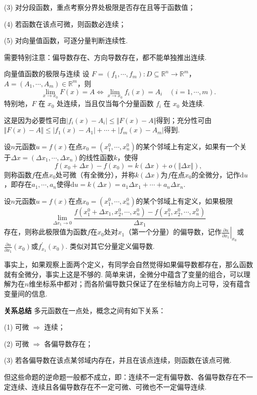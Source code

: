 \documentclass{ctexart}
\newenvironment{custom}[1]{\par\noindent \textbf{#1}\quad}{\par\vspace{1em}}
\begin{document}
(3) 对分段函数，重点考察分界处极限是否存在且等于函数值；

(4) 若函数在该点可微，则函数必连续；

(5) 对向量值函数，可逐分量判断连续性.

需要特别注意：偏导数存在、方向导数存在，都不能单独推出连续.

\begin{definition}{向量值函数的极限与连续}
设 $F=(f_1,\cdots,f_m):D\subseteq\mathbb{R}^n\to\mathbb{R}^m$，
$A=(A_1,\cdots,A_m)\in\mathbb{R}^m$，则
$$\lim\limits_{x\to x_0}F(x)=A
\Longleftrightarrow
\lim\limits_{x\to x_0}f_i(x)=A_i\quad(i=1,\cdots,m).$$
特别地，$F$ 在 $x_0$ 处连续，当且仅当每个分量函数 $f_i$ 在 $x_0$ 处连续.

这是因为必要性可由$|f_i(x)-A_i|\leqslant \Vert F(x)-A\Vert$得到；充分性可由$\Vert F(x)-A\Vert\leqslant |f_1(x)-A_1|+\cdots+|f_m(x)-A_m|$得到.
\end{definition}

\begin{definition}
设$n$元函数$u=f(x)$在点$x_{0}=(x_{1}^{0},\cdots,x_{n}^{0})$的某个邻域上有定义，如果有一个关于$\Delta x=(\Delta x_{1},\cdots,\Delta x_{n})$的线性函数$k$，使得
$$f(x_{0}+\Delta x)-f(x_{0})=k(\Delta x)+o(\Vert \Delta x\Vert),$$
则称函数$f$在点$x_{0}$处可微（有全微分），并称$k(\Delta x)$为$f$在点$x_{0}$的全微分，记作$\mathrm{d}u$，即存在$a_{1},\cdots,a_{n}$使得$\mathrm{d}u=k(\Delta x)=a_{1}\Delta x_{1}+\cdots+a_{n}\Delta x_{n}$.
\end{definition}

\begin{definition}
设$n$元函数$u=f(x)$在点$x_{0}=(x_{1}^{0},\cdots,x_{n}^{0})$的某个邻域上有定义，如果极限
$$\lim\limits_{\Delta x_{1}\to 0}{\frac{f(x_{1}^{0}+\Delta x_{1},x_{2}^{0},\cdots,x_{n}^{0})-f(x_{1}^{0},x_{2}^{0},\cdots,x_{n}^{0})}{\Delta x_{1}}}$$
存在，则称此极限值为函数$f$在$x_{0}$处对$x_{1}$（第一个分量）的偏导数，记作$\left.\frac{\partial u}{\partial x_{1}}\right|_{x_{0}}$或$\frac{\partial u}{\partial x_{1}}(x_{0})$或$f^{\prime}_{x_{1}}(x_{0})$. 类似对其它分量定义偏导数.
\end{definition}

事实上，如果观察上面两个定义，有同学会自然觉得如果偏导数都存在，那么函数就有全微分，事实上这是不够的. 简单来讲，全微分中蕴含了变量的组合，可以理解为在$n$维坐标系中都对；而各阶偏导数只保证了在坐标轴方向上可导，没有蕴含变量间的信息.

\begin{custom}{关系总结}
多元函数在一点处，概念之间有如下关系：

(1) 可微 $\Rightarrow$ 连续；

(2) 可微 $\Rightarrow$ 各偏导数存在；

(3) 若各偏导数在该点某邻域内存在，并且在该点连续，则函数在该点可微.

但这些命题的逆命题一般都不成立，即：连续不一定有偏导数、各偏导数存在不一定连续、连续且各偏导数存在不一定可微、可微也不一定偏导连续.
\end{custom}
\end{document}
